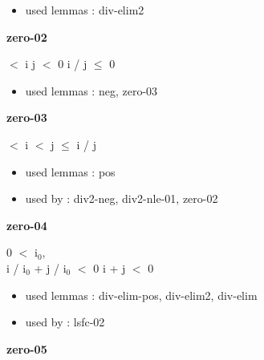 \documentclass[a4paper]{article}
\begin{document}
\begin{itemize}


\item       used lemmas  : div-elim2

\end{itemize}

\medskip

\bigskip

{\large\bf zero-02}

\medskip

  $<$ i \And j $<$ 0 \Imp i / j $\le$ 0

\begin{itemize}


\item       used lemmas  : neg, zero-03

\end{itemize}

\medskip

\bigskip

{\large\bf zero-03}

\medskip

  $<$ i  $<$ j  $\le$ i / j

\begin{itemize}


\item       used lemmas  : pos
\item       used by      : div2-neg, div2-nle-01, zero-02

\end{itemize}

\medskip

\bigskip

{\large\bf zero-04}

\medskip

0 $<$ $\mbox{i}_{0}$, \\
i / $\mbox{i}_{0}$ + j / $\mbox{i}_{0}$ $<$ 0 \Fol i + j $<$ 0

\begin{itemize}


\item       used lemmas  : div-elim-pos, div-elim2, div-elim
\item       used by      : lsfc-02

\end{itemize}

\medskip

\bigskip

{\large\bf zero-05}

\medskip
\end{document}
